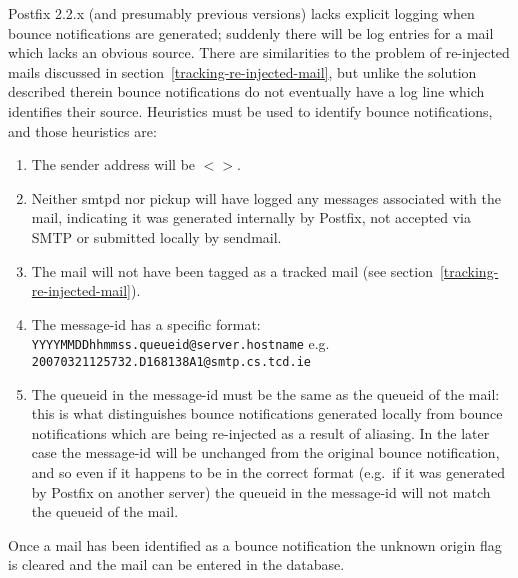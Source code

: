 \documentclass[a4paper,12pt,draft]{article}
\begin{document}
\label{identifying-bounce-notifications}

Postfix 2.2.x (and presumably previous versions) lacks explicit logging
when bounce notifications are generated; suddenly there will be log entries
for a mail which lacks an obvious source.  There are similarities to the
problem of re-injected mails discussed in
section~\ref{tracking-re-injected-mail}, but unlike the solution described
therein bounce notifications do not eventually have a log line which
identifies their source.  Heuristics must be used to identify bounce
notifications, and those heuristics are:

\begin{enumerate}

    \item The sender address will be $<>$.

    \item Neither smtpd nor pickup will have logged any messages associated
        with the mail, indicating it was generated internally by Postfix,
        not accepted via SMTP or submitted locally by sendmail.

    \item The mail will not have been tagged as a tracked mail (see
        section~\ref{tracking-re-injected-mail}).

    \item The message-id has a specific format: \newline
        \texttt{YYYYMMDDhhmmss.queueid@server.hostname} \newline
        e.g. \texttt{20070321125732.D168138A1@smtp.cs.tcd.ie}

    \item The queueid in the message-id must be the same as the queueid of
        the mail: this is what distinguishes bounce notifications generated
        locally from bounce notifications which are being re-injected as a
        result of aliasing.  In the later case the message-id will be
        unchanged from the original bounce notification, and so even if it
        happens to be in the correct format (e.g.\ if it was generated by
        Postfix on another server) the queueid in the message-id will not
        match the queueid of the mail.

\end{enumerate}

Once a mail has been identified as a bounce notification the unknown origin
flag is cleared and the mail can be entered in the database.
\end{document}
